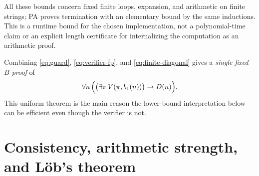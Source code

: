\documentclass[11pt]{article}
\theoremstyle{remark}
\begin{document}
All these bounds concern fixed finite loops, expansion, and arithmetic on
finite strings; PA proves termination with an elementary bound by the same
inductions. This is a runtime bound for the chosen implementation, not a
polynomial-time claim or an explicit length certificate for internalizing
the computation as an arithmetic proof.

Combining \eqref{eq:guard}, \eqref{eq:verifier-fp}, and
\eqref{eq:finite-diagonal} gives a \emph{single fixed $B$-proof} of
\begin{equation}\label{eq:uniform-image}
 \forall n\,\Bigl(\bigl(\exists\pi\,V(\pi,b_1(n))\bigr)\to D(n)\Bigr).
\end{equation}
This uniform theorem is the main reason the lower-bound interpretation below
can be efficient even though the verifier is not.

\section{Consistency, arithmetic strength, and L\"ob's theorem}
\end{document}
